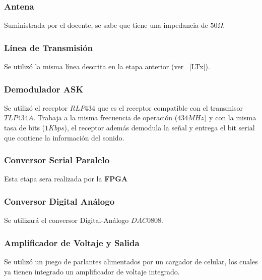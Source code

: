\documentclass[10pt,graphicx,caption,rotating]{article}
\begin{document}
\subsubsection{Antena}
\noindent
Suministrada por el docente, se sabe que tiene una impedancia de $50 \Omega$.

\subsubsection{Línea de Transmisión}
\noindent
Se utilizó la misma línea descrita en la etapa anterior (ver  ~\ref{LTx}).

\subsubsection{Demodulador ASK}
\noindent
Se utilizó el receptor $RLP434$ que es el receptor compatible con el transmisor $TLP434A$. Trabaja a la misma frecuencia de operación ($434 MHz$) y con la misma tasa de bits ($1Kbps$), el receptor además demodula la señal y entrega el bit serial que contiene la información del sonido.

\subsubsection{Conversor Serial Paralelo}
\noindent
Esta etapa sera realizada por la \textbf{FPGA}

\subsubsection{Conversor Digital Análogo}
\noindent
Se utilizará el conversor Digital-Análogo $DAC0808$.

\subsubsection{Amplificador de Voltaje y Salida}
\noindent
Se utilizó un juego de parlantes alimentados por un cargador de celular, los cuales ya tienen integrado un amplificador de voltaje integrado.
\end{document}
